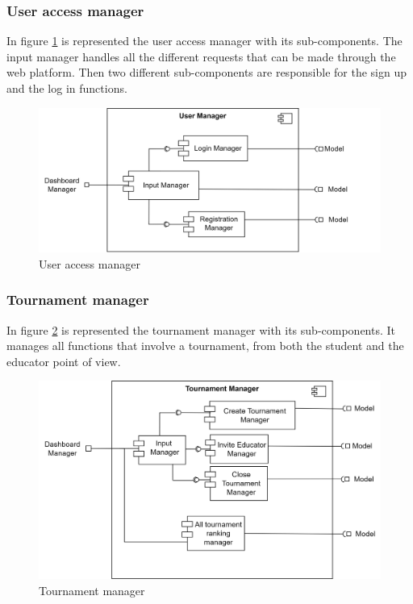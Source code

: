 \subsubsection*{User access manager}
In figure \ref{fig:user-man} is represented the user access manager with its sub-components. The input manager handles all the different requests that can be made through the web platform. Then two different sub-components are responsible for the sign up and the log in functions.
\begin{figure}[h]
    \centering
    \includegraphics[scale = 0.5]{images/user-man.png}
    \caption{User access manager}
    \label{fig:user-man}
\end{figure}
\clearpage

\subsubsection*{Tournament manager}
In figure \ref{fig:tourn-man} is represented the tournament manager with its sub-components. It manages all functions that involve a tournament, from both the student and the educator point of view.
\begin{figure}[h]
    \centering
    \includegraphics[scale = 0.5]{images/tournament-man.png}
    \caption{Tournament manager}
    \label{fig:tourn-man}
\end{figure}

